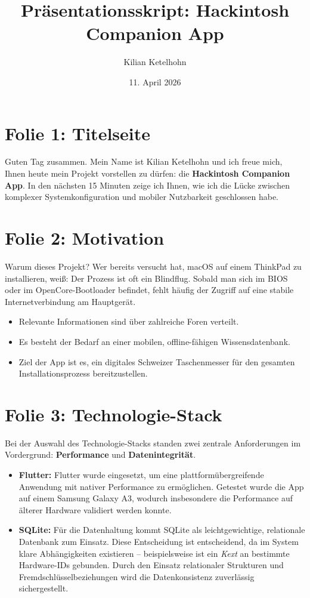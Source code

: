 \documentclass[12pt]{article}
\title{Präsentationsskript: Hackintosh Companion App}
\author{Kilian Ketelhohn}
\date{11. April 2026}
\begin{document}
\maketitle

\section*{Folie 1: Titelseite}
Guten Tag zusammen. Mein Name ist Kilian Ketelhohn und ich freue mich, Ihnen heute mein Projekt vorstellen zu dürfen: die \textbf{Hackintosh Companion App}. In den nächsten 15 Minuten zeige ich Ihnen, wie ich die Lücke zwischen komplexer Systemkonfiguration und mobiler Nutzbarkeit geschlossen habe.

\section*{Folie 2: Motivation}
Warum dieses Projekt? Wer bereits versucht hat, macOS auf einem ThinkPad zu installieren, weiß: Der Prozess ist oft ein Blindflug. Sobald man sich im BIOS oder im OpenCore-Bootloader befindet, fehlt häufig der Zugriff auf eine stabile Internetverbindung am Hauptgerät.

\begin{itemize}
    \item Relevante Informationen sind über zahlreiche Foren verteilt.
    \item Es besteht der Bedarf an einer mobilen, offline-fähigen Wissensdatenbank.
    \item Ziel der App ist es, ein digitales Schweizer Taschenmesser für den gesamten Installationsprozess bereitzustellen.
\end{itemize}

\section*{Folie 3: Technologie-Stack}
Bei der Auswahl des Technologie-Stacks standen zwei zentrale Anforderungen im Vordergrund: \textbf{Performance} und \textbf{Datenintegrität}.

\begin{itemize}
    \item \textbf{Flutter:} Flutter wurde eingesetzt, um eine plattformübergreifende Anwendung mit nativer Performance zu ermöglichen. Getestet wurde die App auf einem Samsung Galaxy A3, wodurch insbesondere die Performance auf älterer Hardware validiert werden konnte.

    \item \textbf{SQLite:} Für die Datenhaltung kommt SQLite als leichtgewichtige, relationale Datenbank zum Einsatz. Diese Entscheidung ist entscheidend, da im System klare Abhängigkeiten existieren – beispielsweise ist ein \textit{Kext} an bestimmte Hardware-IDs gebunden. Durch den Einsatz relationaler Strukturen und Fremdschlüsselbeziehungen wird die Datenkonsistenz zuverlässig sichergestellt.
\end{itemize}
\end{document}
